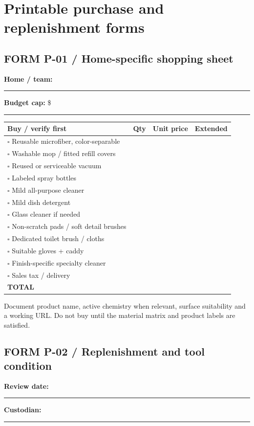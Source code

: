 \documentclass[10pt,letterpaper,oneside]{article}
\newcommand{\subtle}[1]{{\color{graytext}\small #1}}
\newcommand{\smalltable}{\par\small\renewcommand{\arraystretch}{1.24}}
\newcommand{\restorenormalfonttable}{\par\normalsize\renewcommand{\arraystretch}{1}}
\begin{document}
\section{Printable purchase and replenishment forms}
\newpage\subsection*{FORM P-01 / Home-specific shopping sheet}
\textbf{Home / team:} \rule{2.5in}{.3pt}\quad\textbf{Budget cap:} \$\rule{1in}{.3pt}
\smalltable\begin{longtable}{p{.44\linewidth}p{.11\linewidth}p{.16\linewidth}p{.17\linewidth}}\toprule
Buy / verify first & Qty & Unit price & Extended\\\midrule\endhead
\(\square\) Reusable microfiber, color-separable & & & \\
\(\square\) Washable mop / fitted refill covers & & & \\
\(\square\) Reused or serviceable vacuum & & & \\
\(\square\) Labeled spray bottles & & & \\
\(\square\) Mild all-purpose cleaner & & & \\
\(\square\) Mild dish detergent & & & \\
\(\square\) Glass cleaner if needed & & & \\
\(\square\) Non-scratch pads / soft detail brushes & & & \\
\(\square\) Dedicated toilet brush / cloths & & & \\
\(\square\) Suitable gloves + caddy & & & \\
\(\square\) Finish-specific specialty cleaner & & & \\
\(\square\) Sales tax / delivery & & & \\
\midrule
\textbf{TOTAL} & & & \\\bottomrule\end{longtable}\restorenormalfonttable
\subtle{Document product name, active chemistry when relevant, surface suitability and a working URL. Do not buy until the material matrix and product labels are satisfied.}
\newpage\subsection*{FORM P-02 / Replenishment and tool condition}
\textbf{Review date:} \rule{2in}{.3pt}\quad\textbf{Custodian:} \rule{2in}{.3pt}
\end{document}

